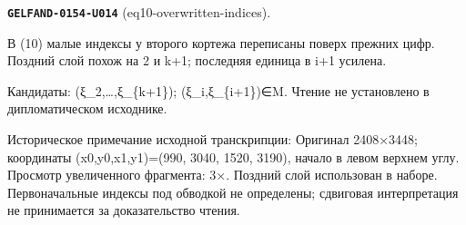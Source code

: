 \par\noindent\leavevmode{}\label{GELFAND-0154-U014}\textbf{\texttt{GELFAND-0154-U014}} (eq10-overwritten-indices).\nopagebreak[4]\par
В (10) малые индексы у второго кортежа переписаны поверх прежних цифр. Поздний слой похож на 2 и k+1; последняя единица в i+1 усилена.\par
Кандидаты: (ξ\_2,…,ξ\_\{k+1\}); (ξ\_i,ξ\_\{i+1\})∈M. Чтение не установлено в дипломатическом исходнике.\par
Историческое примечание исходной транскрипции: Оригинал 2408×3448; координаты (x0,y0,x1,y1)=(990, 3040, 1520, 3190), начало в левом верхнем углу. Просмотр увеличенного фрагмента: 3×. Поздний слой использован в наборе. Первоначальные индексы под обводкой не определены; сдвиговая интерпретация не принимается за доказательство чтения.\par\medskip
